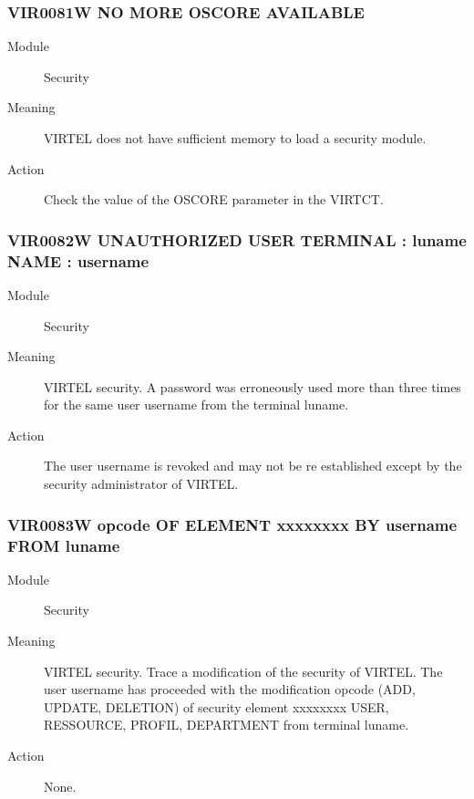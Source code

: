 \documentclass[letterpaper,10pt,english]{sphinxmanual}
\begin{document}
\subsubsection{VIR0081W NO MORE OSCORE AVAILABLE}
\label{\detokenize{messages:vir0081w-no-more-oscore-available}}\begin{description}
\item[{Module}] \leavevmode
Security

\item[{Meaning}] \leavevmode
VIRTEL does not have sufficient memory to load a security module.

\item[{Action}] \leavevmode
Check the value of the OSCORE parameter in the VIRTCT.

\end{description}


\subsubsection{VIR0082W UNAUTHORIZED USER TERMINAL : luname NAME : username}
\label{\detokenize{messages:vir0082w-unauthorized-user-terminal-luname-name-username}}\begin{description}
\item[{Module}] \leavevmode
Security

\item[{Meaning}] \leavevmode
VIRTEL security. A password was erroneously used more than three times for the same user username from the terminal luname.

\item[{Action}] \leavevmode
The user username is revoked and may not be re established except by the security administrator of VIRTEL.

\end{description}


\subsubsection{VIR0083W opcode OF ELEMENT xxxxxxxx BY username FROM luname}
\label{\detokenize{messages:vir0083w-opcode-of-element-xxxxxxxx-by-username-from-luname}}\begin{description}
\item[{Module}] \leavevmode
Security

\item[{Meaning}] \leavevmode
VIRTEL security. Trace a modification of the security of VIRTEL. The user username has proceeded with the modification opcode (ADD, UPDATE, DELETION) of security element xxxxxxxx USER, RESSOURCE, PROFIL, DEPARTMENT from terminal luname.

\item[{Action}] \leavevmode
None.

\end{description}
\end{document}
